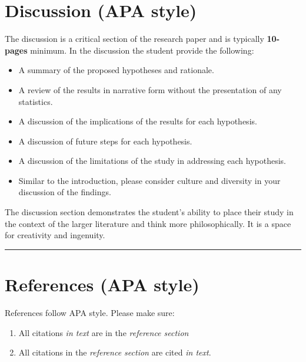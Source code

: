 \documentclass[openany]{book}
\providecommand{\tightlist}{%
  \setlength{\itemsep}{0pt}\setlength{\parskip}{0pt}}
\begin{document}
\hypertarget{discussion-apa-style}{%
\section{Discussion (APA style)}\label{discussion-apa-style}}

The discussion is a critical section of the research paper and is typically \textbf{10-pages} minimum. In the discussion the student provide the following:

\begin{itemize}
\tightlist
\item
  A summary of the proposed hypotheses and rationale.
\item
  A review of the results in narrative form without the presentation of any statistics.
\item
  A discussion of the implications of the results for each hypothesis.
\item
  A discussion of future steps for each hypothesis.
\item
  A discussion of the limitations of the study in addressing each hypothesis.
\item
  Similar to the introduction, please consider culture and diversity in your discussion of the findings.
\end{itemize}

The discussion section demonstrates the student's ability to place their study in the context of the larger literature and think more philosophically. It is a space for creativity and ingenuity.

\begin{center}\rule{0.5\linewidth}{0.5pt}\end{center}

\hypertarget{references-apa-style}{%
\section{References (APA style)}\label{references-apa-style}}

References follow APA style. Please make sure:

\begin{enumerate}
\def\labelenumi{\arabic{enumi}.}
\tightlist
\item
  All citations \emph{in text} are in the \emph{reference section}
\item
  All citations in the \emph{reference section} are cited \emph{in text}.
\end{enumerate}
\end{document}
